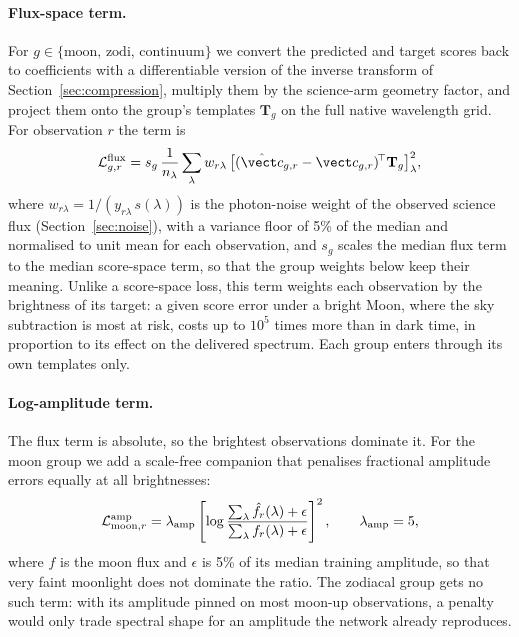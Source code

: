 \paragraph{Flux-space term.} For $g\in\{\text{moon, zodi, continuum}\}$ we
convert the predicted and target scores back to coefficients with a
differentiable version of the inverse transform of
Section~\ref{sec:compression}, multiply them by the science-arm geometry
factor, and project them onto the group's templates $\mathbf{T}_g$ on the
full native wavelength grid. For observation $r$ the term is
\begin{equation}
  \mathcal{L}^{\rm flux}_{g,r} = s_g\,\frac{1}{n_\lambda}\sum_{\lambda}
  w_{r\lambda}\,\big[(\hat{\vect c}_{g,r}-\vect c_{g,r})^{\!\top}\mathbf{T}_g\big]_\lambda^2 ,
\end{equation}
where $w_{r\lambda} = 1/(y_{r\lambda}\,s(\lambda))$ is the photon-noise
weight of the observed science flux (Section~\ref{sec:noise}), with a
variance floor of 5\% of the median and normalised to unit mean for each
observation, and $s_g$ scales the median flux term to the median
score-space term, so that the group weights below keep their meaning.
Unlike a score-space loss, this term weights each observation by the
brightness of its target: a given score error under a bright Moon, where the
sky subtraction is most at risk, costs up to $10^5$ times more than in dark
time, in proportion to its effect on the delivered spectrum. Each group
enters through its own templates only.

\paragraph{Log-amplitude term.} The flux term is absolute, so the brightest
observations dominate it. For the moon group we add a scale-free companion
that penalises fractional amplitude errors equally at all brightnesses:
\begin{equation}
  \mathcal{L}^{\rm amp}_{{\rm moon},r} = \lambda_{\rm amp}\left[\log\frac{\sum_\lambda\hat f_r(\lambda)+\epsilon}{\sum_\lambda f_r(\lambda)+\epsilon}\right]^2,
  \qquad \lambda_{\rm amp} = 5,
\end{equation}
where $f$ is the moon flux and $\epsilon$ is 5\% of its median training
amplitude, so that very faint moonlight does not dominate the ratio. The
zodiacal group gets no such term: with its amplitude pinned on most moon-up
observations, a penalty would only trade spectral shape for an amplitude the
network already reproduces.

